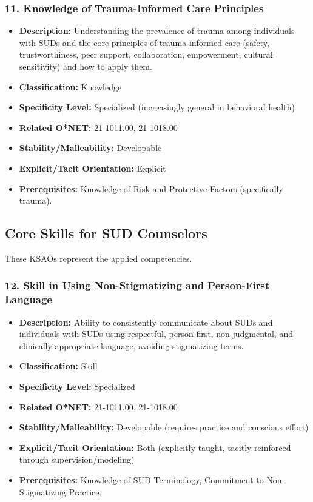 \documentclass[
  letterpaper,
  DIV=11,
  numbers=noendperiod]{scrartcl}
\providecommand{\tightlist}{%
  \setlength{\itemsep}{0pt}\setlength{\parskip}{0pt}}
\begin{document}
\subsubsection{11. Knowledge of Trauma-Informed Care
Principles}\label{knowledge-of-trauma-informed-care-principles}

\begin{itemize}
\tightlist
\item
  \textbf{Description:} Understanding the prevalence of trauma among
  individuals with SUDs and the core principles of trauma-informed care
  (safety, trustworthiness, peer support, collaboration, empowerment,
  cultural sensitivity) and how to apply them.
\item
  \textbf{Classification:} Knowledge
\item
  \textbf{Specificity Level:} Specialized (increasingly general in
  behavioral health)
\item
  \textbf{Related O*NET:} 21-1011.00, 21-1018.00
\item
  \textbf{Stability/Malleability:} Developable
\item
  \textbf{Explicit/Tacit Orientation:} Explicit
\item
  \textbf{Prerequisites:} Knowledge of Risk and Protective Factors
  (specifically trauma).
\end{itemize}

\subsection{Core Skills for SUD
Counselors}\label{core-skills-for-sud-counselors}

These KSAOs represent the applied competencies.

\subsubsection{12. Skill in Using Non-Stigmatizing and Person-First
Language}\label{skill-in-using-non-stigmatizing-and-person-first-language}

\begin{itemize}
\tightlist
\item
  \textbf{Description:} Ability to consistently communicate about SUDs
  and individuals with SUDs using respectful, person-first,
  non-judgmental, and clinically appropriate language, avoiding
  stigmatizing terms.
\item
  \textbf{Classification:} Skill
\item
  \textbf{Specificity Level:} Specialized
\item
  \textbf{Related O*NET:} 21-1011.00, 21-1018.00
\item
  \textbf{Stability/Malleability:} Developable (requires practice and
  conscious effort)
\item
  \textbf{Explicit/Tacit Orientation:} Both (explicitly taught, tacitly
  reinforced through supervision/modeling)
\item
  \textbf{Prerequisites:} Knowledge of SUD Terminology, Commitment to
  Non-Stigmatizing Practice.
\end{itemize}
\end{document}

